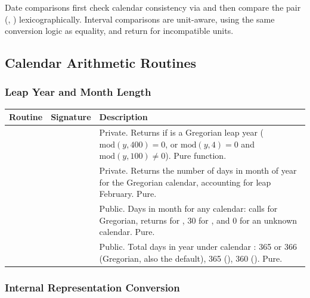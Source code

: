 Date comparisons first check calendar consistency via  and
then compare the pair (, )
lexicographically. Interval comparisons are unit-aware, using the same
conversion logic as equality, and return  for incompatible
units.

\subsection{Calendar Arithmetic Routines}
\label{subsec:date_calendar}

\subsubsection{Leap Year and Month Length}

\begin{longtable}{L{4.5cm} L{4cm} L{6cm}}
  \toprule
  \textbf{Routine} & \textbf{Signature} & \textbf{Description} \\
  \midrule
  \endhead
  \bottomrule
  \endfoot
   &  &
    Private. Returns  if  is a Gregorian leap year
    ($\text{mod}(y,400)=0$, or $\text{mod}(y,4)=0$ and
    $\text{mod}(y,100)\ne0$). Pure function. \\
   &  &
    Private. Returns the number of days in month  of year
     for the Gregorian calendar, accounting for leap February.
    Pure. \\
   &  &
    Public. Days in month  for any calendar: calls
     for Gregorian, returns  for
    , 30 for , and 0 for an unknown calendar.
    Pure. \\
   &  &
    Public. Total days in year  under calendar :
    365 or 366 (Gregorian, also the default), 365 (),
    360 (). Pure. \\
\end{longtable}

\subsubsection{Internal Representation Conversion}

